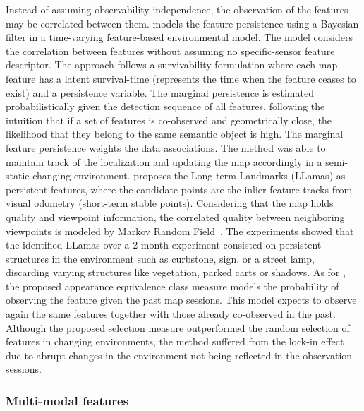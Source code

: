 Instead of assuming observability independence, the observation of the features may be correlated between them.
\cite{nobre-et-al:2018:8461111} models the feature persistence using a Bayesian filter in a time-varying feature-based environmental model. The model considers the correlation between features without assuming no specific-sensor feature descriptor. The approach follows a survivability formulation where each map feature has a latent survival-time (represents the time when the feature ceases to exist) and a persistence variable. The marginal persistence is estimated probabilistically given the detection sequence of all features, following the intuition that if a set of features is co-observed and geometrically close, the likelihood that they belong to the same semantic object is high. The marginal feature persistence weights the data associations. The method was able to maintain track of the localization and updating the map accordingly in a semi-static changing environment.
\cite{luthardt-et-al:2018:8569323} proposes the Long-term Landmarks (LLamas) as persistent features, where the candidate points are the inlier feature tracks from visual odometry (short-term stable points). Considering that the map holds quality and viewpoint information, the correlated quality between neighboring viewpoints is modeled by Markov Random Field~\parencite{book:probabilistic-robotics}. The experiments showed that the identified LLamas over a 2 month experiment consisted on persistent structures in the environment such as curbstone, sign, or a street lamp, discarding varying structures like vegetation, parked carts or shadows.
As for \cite{bürki-et-al:2019:21870}, the proposed appearance equivalence class measure models the probability of observing the feature given the past map sessions. This model expects to observe again the same features together with those already co-observed in the past.
Although the proposed selection measure outperformed the random selection of features in changing environments, the method suffered from the lock-in effect due to abrupt changes in the environment not being reflected in the observation sessions.



\subsubsection{Multi-modal features}

